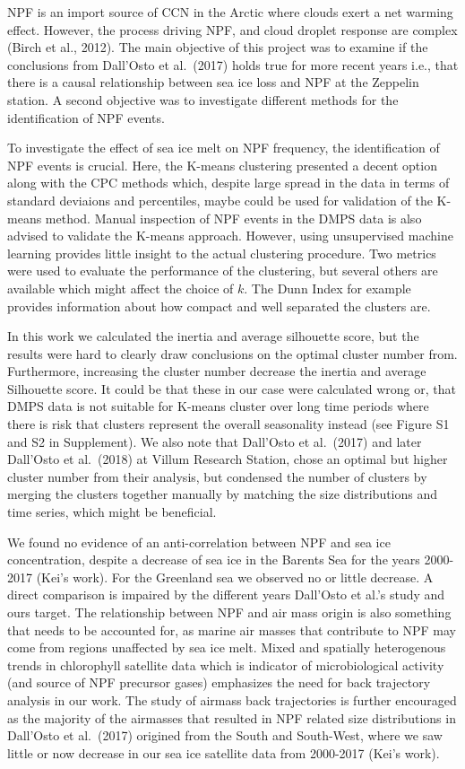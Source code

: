 \documentclass[11pt]{article}
\begin{document}
NPF is an import source of CCN in the Arctic where clouds exert a net
warming effect. However, the process driving NPF, and cloud droplet
response are complex (Birch et al., 2012). The main objective of this
project was to examine if the conclusions from Dall'Osto et al.~(2017)
holds true for more recent years i.e., that there is a causal
relationship between sea ice loss and NPF at the Zeppelin station. A
second objective was to investigate different methods for the
identification of NPF events.

To investigate the effect of sea ice melt on NPF frequency, the
identification of NPF events is crucial. Here, the K-means clustering
presented a decent option along with the CPC methods which, despite
large spread in the data in terms of standard deviaions and percentiles,
maybe could be used for validation of the K-means method. Manual
inspection of NPF events in the DMPS data is also advised to validate
the K-means approach. However, using unsupervised machine learning
provides little insight to the actual clustering procedure. Two metrics
were used to evaluate the performance of the clustering, but several
others are available which might affect the choice of \(k\). The Dunn
Index for example provides information about how compact and well
separated the clusters are.

In this work we calculated the inertia and average silhouette score, but
the results were hard to clearly draw conclusions on the optimal cluster
number from. Furthermore, increasing the cluster number decrease the
inertia and average Silhouette score. It could be that these in our case
were calculated wrong or, that DMPS data is not suitable for K-means
cluster over long time periods where there is risk that clusters
represent the overall seasonality instead (see Figure S1 and S2 in
Supplement). We also note that Dall'Osto et al.~(2017) and later
Dall'Osto et al.~(2018) at Villum Research Station, chose an optimal but
higher cluster number from their analysis, but condensed the number of
clusters by merging the clusters together manually by matching the size
distributions and time series, which might be beneficial.

We found no evidence of an anti-correlation between NPF and sea ice
concentration, despite a decrease of sea ice in the Barents Sea for the
years 2000-2017 (Kei's work). For the Greenland sea we observed no or
little decrease. A direct comparison is impaired by the different years
Dall'Osto et al.'s study and ours target. The relationship between NPF
and air mass origin is also something that needs to be accounted for, as
marine air masses that contribute to NPF may come from regions
unaffected by sea ice melt. Mixed and spatially heterogenous trends in
chlorophyll satellite data which is indicator of microbiological
activity (and source of NPF precursor gases) emphasizes the need for
back trajectory analysis in our work. The study of airmass back
trajectories is further encouraged as the majority of the airmasses that
resulted in NPF related size distributions in Dall'Osto et al.~(2017)
origined from the South and South-West, where we saw little or now
decrease in our sea ice satellite data from 2000-2017 (Kei's work).
\end{document}
